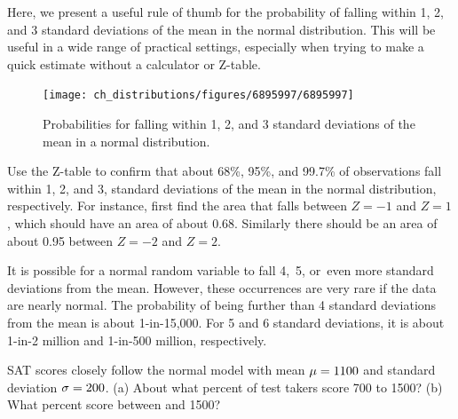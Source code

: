Here, we present a useful rule of thumb for the probability of falling within 1, 2, and 3 standard deviations of the mean in the normal distribution. This will be useful in a wide range of practical settings, especially when trying to make a quick estimate without a calculator or Z-table.

\begin{figure}[hht]
\centering
\texttt{[image: ch\_distributions/figures/6895997/6895997]}
\caption{Probabilities for falling within 1, 2, and 3 standard deviations of the mean in a normal distribution.}
\label{6895997}
\end{figure}

\begin{exercisewrap}
\begin{nexercise}
Use the Z-table to confirm that about 68\%, 95\%, and 99.7\%
of observations fall within 1, 2, and 3, standard deviations
of the mean in the normal distribution, respectively.
For instance, first find the area that falls between $Z=-1$
and $Z=1$, which should have an area of about 0.68.
Similarly there should be an area of about 0.95 between
$Z=-2$ and $Z=2$.\footnotemark{}
\end{nexercise}
\end{exercisewrap}

It is possible for a normal random variable to fall 4,~5,
or~even more standard deviations from the mean.
However, these occurrences are very rare if the data are
nearly normal.
The probability of being further than 4 standard deviations
from the mean is about 1-in-15,000.
For 5 and 6 standard deviations, it is about 1-in-2 million
and 1-in-500 million, respectively.

\begin{exercisewrap}
\begin{nexercise}
SAT scores closely follow the normal model with mean
$\mu = 1100{}$ and standard deviation $\sigma = 200{}$.
(a) About what percent of test takers score 700 to 1500?
(b) What percent score between \satmean{} and 1500?\footnotemark{}
\end{nexercise}
\end{exercisewrap}




